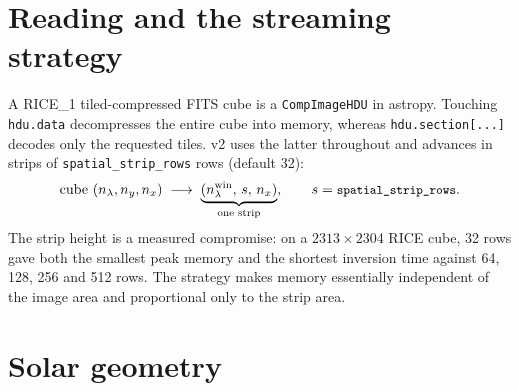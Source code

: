 \documentclass[11pt,a4paper]{article}
\newcommand{\code}[1]{\texttt{\small #1}}
\begin{document}
\section{Reading and the streaming strategy}

A RICE\_1 tiled-compressed FITS cube is a \code{CompImageHDU} in astropy.
Touching \code{hdu.data} decompresses the entire cube into memory, whereas
\code{hdu.section[...]} decodes only the requested tiles.  v2 uses the latter
throughout and advances in strips of \code{spatial\_strip\_rows} rows
(default 32):
\begin{equation}
  \text{cube } (n_\lambda, n_y, n_x) \;\longrightarrow\;
  \underbrace{(n_\lambda^{\mathrm{win}},\, s,\, n_x)}_{\text{one strip}},
  \qquad s = \code{spatial\_strip\_rows}.
\end{equation}
The strip height is a measured compromise: on a $2313\times2304$ RICE cube,
32 rows gave both the smallest peak memory and the shortest inversion time
against 64, 128, 256 and 512 rows.  The strategy makes memory essentially
independent of the image area and proportional only to the strip area.

\section{Solar geometry}
\label{sec:geometry}
\end{document}
